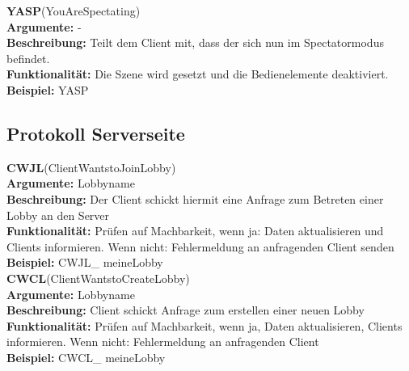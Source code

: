 \documentclass[a4paper, 12pt, oneside, headsepline=.5pt,footsepline=.5pt]{scrartcl}
\begin{document}
{\large \textbf{YASP}(YouAreSpectating)} \\
\hspace{4ex} \textbf{Argumente:} {-} \\
\hspace{4ex} \textbf{Beschreibung:} {Teilt dem Client mit, dass der sich nun im Spectatormodus befindet.} \\
\hspace{4ex} \textbf{Funktionalität:} {Die Szene wird gesetzt und die Bedienelemente deaktiviert.} \\
\hspace{4ex} \textbf{Beispiel:} {YASP} \\

\subsection{Protokoll Serverseite} 
{\large \textbf{CWJL}(ClientWantstoJoinLobby)} \\
\hspace{4ex} \textbf{Argumente:} {Lobbyname} \\
\hspace{4ex} \textbf{Beschreibung:} {Der Client schickt hiermit eine Anfrage zum Betreten einer Lobby an den Server} \\
\hspace{4ex} \textbf{Funktionalität:} {Prüfen auf Machbarkeit, wenn ja: Daten aktualisieren und Clients informieren. Wenn nicht: Fehlermeldung an anfragenden Client senden} \\
\hspace{4ex} \textbf{Beispiel:} {CWJL\_ meineLobby} \\

{\large \textbf{CWCL}(ClientWantstoCreateLobby)} \\
\hspace{4ex} \textbf{Argumente:} {Lobbyname} \\
\hspace{4ex} \textbf{Beschreibung:} {Client schickt Anfrage zum erstellen einer neuen Lobby} \\
\hspace{4ex} \textbf{Funktionalität:} {Prüfen auf Machbarkeit, wenn ja, Daten aktualisieren, Clients informieren. Wenn nicht: Fehlermeldung an anfragenden Client} \\
\hspace{4ex} \textbf{Beispiel:} {CWCL\_ meineLobby} \\
\end{document}
